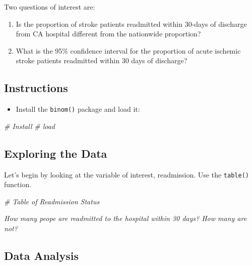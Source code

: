 \documentclass[
]{article}
\newenvironment{Shaded}{\begin{snugshade}}{\end{snugshade}}
\newcommand{\CommentTok}[1]{\textcolor[rgb]{0.56,0.35,0.01}{\textit{#1}}}
\providecommand{\tightlist}{%
  \setlength{\itemsep}{0pt}\setlength{\parskip}{0pt}}
\begin{document}
Two questions of interest are:

\begin{enumerate}
\def\labelenumi{\arabic{enumi}.}
\item
  Is the proportion of stroke patients readmitted within 30-days of
  discharge from CA hospital different from the nationwide proportion?
\item
  What is the 95\% confidence interval for the proportion of acute
  ischemic stroke patients readmitted within 30 days of discharge?
\end{enumerate}

\hypertarget{instructions}{%
\subsection{Instructions}\label{instructions}}

\begin{itemize}
\tightlist
\item
  Install the \texttt{binom()} package and load it:
\end{itemize}

\begin{Shaded}
\begin{Highlighting}[]
\CommentTok{\# Install}
\CommentTok{\# load}
\end{Highlighting}
\end{Shaded}

\hypertarget{exploring-the-data}{%
\subsection{Exploring the Data}\label{exploring-the-data}}

Let's begin by looking at the variable of interest, readmission. Use the
\texttt{table()} function.

\begin{Shaded}
\begin{Highlighting}[]
\CommentTok{\# Table of Readmission Status}
\end{Highlighting}
\end{Shaded}

\emph{How many peope are readmitted to the hospital within 30 days? How
many are not?}

\hypertarget{data-analysis}{%
\subsection{Data Analysis}\label{data-analysis}}
\end{document}
